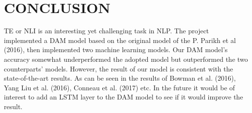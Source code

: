 \documentclass[runningheads]{llncs}
\begin{document}
\section{CONCLUSION}
TE or NLI is an interesting yet challenging task in NLP. The project implemented a DAM model based on the original model of the P. Parikh et al (2016), then implemented two machine learning models. Our DAM model’s accuracy somewhat underperformed the adopted model but outperformed the two counterparts’ models. However, the result of our model is consistent with the state-of-the-art results. As can be seen in the results of Bowman et al. (2016), Yang Liu et al. (2016), Conneau et al. (2017) etc. In the future it would be of interest to add an LSTM layer to the DAM model to see if it would improve the result.





\end{document}
